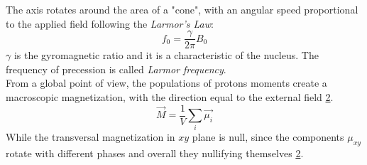  \begin{figure}[h]
    \centering
    \caption{}
    \label{fig:FieldB0}
 \end{figure}

 \noindent The axis rotates around the area of a "cone", with an angular speed proportional to the applied field following the \emph{Larmor's Law}:
 \begin{equation}
    f_{0}=\frac{\gamma}{2\pi} B_{0}
 \end{equation}
 $\gamma$ is the gyromagnetic ratio and it is a characteristic of the nucleus. The frequency of precession is called \emph{Larmor frequency}.\\
 From a global point of view, the populations of protons moments create a macroscopic magnetization, with the direction equal to the external field \ref{fig:macroscopic_magnetization}.
 \begin{equation}
    \vec{M}=\frac{1}{V}\sum_{i} \vec{\mu_{i}}
 \end{equation}
 While the transversal magnetization in $xy$ plane is null, since the components $\mu_{xy}$ rotate with different phases and overall they nullifying themselves \ref{fig:macroscopic_magnetization}.

 \begin{figure}[h]
    \centering
    \caption{}
    \label{fig:macroscopic_magnetization}
 \end{figure}

